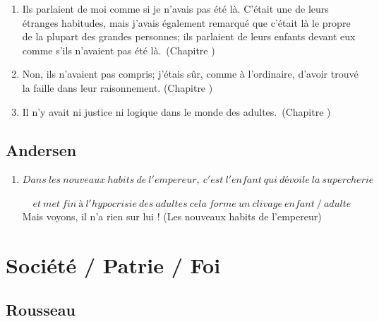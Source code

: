 \documentclass[a4paper, 11pt, hidelinks]{article}
\newcommand{\rb}[1]{\Romanbar{#1}}
\begin{document}
\begin{enumerate}
    \item Ils parlaient de moi comme si je n'avais pas été là. C'était une de leurs étranges habitudes, mais j'avais également remarqué que c'était là le propre de la plupart des grandes personnes; ils parlaient de leurs enfants devant eux comme s'ils n'avaient pas été là. (Chapitre \rb{4})
    \item Non, ils n'avaient pas compris; j'étais sûr, comme à l'ordinaire, d'avoir trouvé la faille dans leur raisonnement. (Chapitre \rb{4})
    \item Il n'y avait ni justice ni logique dans le monde des adultes. (Chapitre \rb{7})
\end{enumerate}




\subsection{Andersen}


\begin{enumerate}
    \item \[Dans \ les \ nouveaux \ habits \ de \ l'empereur, \ c'est \ l'enfant \ qui \ dévoile \ la \ supercherie \] \[ et \ met \ fin \ à \ l'hypocrisie \ des \ adultes \ cela \ forme \ un \ clivage \ enfant \ / \ adulte\] Mais voyons, il n'a rien sur lui ! (Les nouveaux habits de l'empereur)
\end{enumerate}
































\section{Société / Patrie / Foi}



\subsection{Rousseau}
\end{document}
